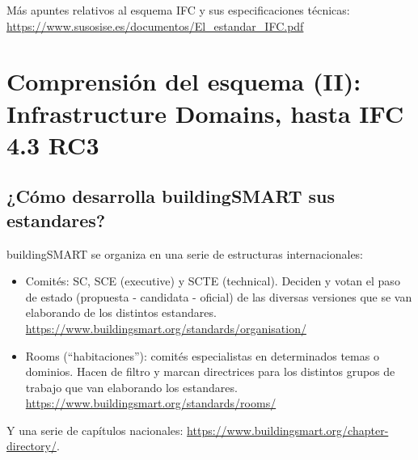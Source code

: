 \documentclass[spanish,10pt,a4paper,final,oneside]{article}
\begin{document}
\vspace*{\fill}
Más apuntes relativos al esquema IFC y sus especificaciones técnicas: \url{https://www.susosise.es/documentos/El_estandar_IFC.pdf}
\vspace*{\fill}
%
\newpage





\section{Comprensión del esquema (II): Infrastructure Domains, hasta IFC 4.3 RC3}


\subsection{¿Cómo desarrolla buildingSMART sus estandares?}

buildingSMART se organiza en una serie de estructuras internacionales:
\begin{itemize}
\item Comités: SC, SCE (executive) y SCTE (technical). Deciden y votan el paso de estado (propuesta - candidata - oficial) de las diversas versiones que se van elaborando de los distintos estandares.
\\ \url{https://www.buildingsmart.org/standards/organisation/}
\item Rooms (``habitaciones''): comités especialistas en determinados temas o dominios. Hacen de filtro y marcan  directrices para los distintos grupos de trabajo que van elaborando los estandares.
\\ \url{https://www.buildingsmart.org/standards/rooms/}
\end{itemize}
Y una serie de capítulos nacionales: \url{https://www.buildingsmart.org/chapter-directory/}.
\vspace{1cm}
\end{document}
